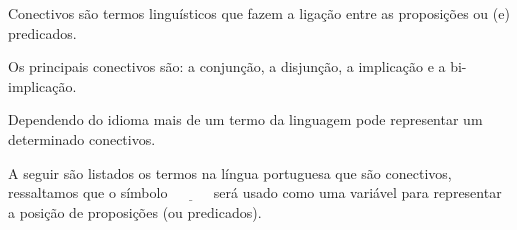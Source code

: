 \begin{definition}[Conectivos]\label{def:Conectivos}
	Conectivos são termos linguísticos que fazem a ligação entre as proposições ou (e) predicados.
\end{definition}

Os principais conectivos são: a conjunção, a disjunção, a implicação e a bi-implicação.

\begin{remark}
    Dependendo do idioma mais de um termo da linguagem pode representar um determinado conectivos.
\end{remark}

A seguir são listados os termos na língua portuguesa que são conectivos, ressaltamos que o símbolo $\underline{ \ \ \ \ \ \ \ \ \ \ \ \ }$ será usado como uma variável para representar a posição de proposições (ou predicados).

